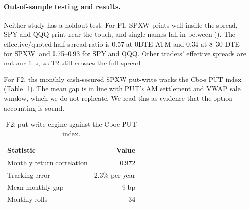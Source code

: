 \documentclass[../main.tex]{subfiles}
\begin{document}
\paragraph{Out-of-sample testing and results.}
Neither study has a holdout test. For F1, SPXW prints well inside the spread, SPY and QQQ print near the touch, and single names fall in between (). The effective/quoted half-spread ratio is 0.57 at 0DTE ATM and 0.34 at 8--30 DTE for SPXW, and 0.75--0.93 for SPY and QQQ. Other traders' effective spreads are not our fills, so T2 still crosses the full spread.

For F2, the monthly cash-secured SPXW put-write tracks the Cboe PUT index (Table~\ref{tab:f2}). The mean gap is in line with PUT's AM settlement and VWAP sale window, which we do not replicate. We read this as evidence that the option accounting is sound.

\begin{table}[tbp]
\centering\small
\caption{F2: put-write engine against the Cboe PUT index.}\label{tab:f2}
\begin{tabular}{@{}lr@{}}
\toprule
Statistic & Value \\
\midrule
Monthly return correlation & 0.972 \\
Tracking error & 2.3\% per year \\
Mean monthly gap & $-$9 bp \\
Monthly rolls & 34 \\
\bottomrule
\end{tabular}
\end{table}

\end{document}
